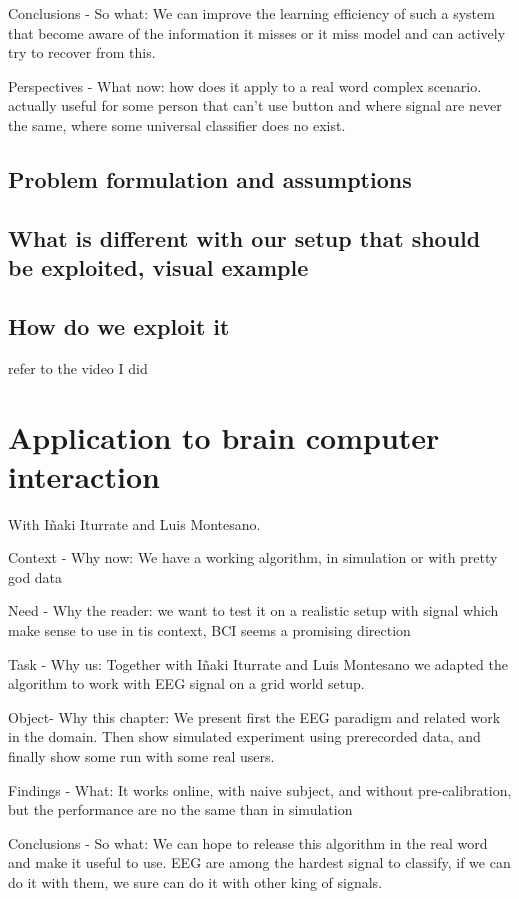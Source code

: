 Conclusions - So what: We can improve the learning efficiency of such a system that become aware of the information it misses or it miss model and can actively try to recover from this.

Perspectives - What now: how does it apply to a real word complex scenario. actually useful for some person that can't use button and where signal are never the same, where some universal classifier does no exist.

\section{Problem formulation and assumptions}

\section{What is different with our setup that should be exploited, visual example}

\section{How do we exploit it}

refer to the video I did

\chapter{Application to brain computer interaction}
\minitoc

With I\~naki Iturrate and Luis Montesano.

Context - Why now: We have a working algorithm, in simulation or with pretty god data

Need - Why the reader: we want to test it on a realistic setup with signal which make sense to use in tis context, BCI seems a promising direction

Task - Why us: Together with I\~naki Iturrate and Luis Montesano we adapted the algorithm to work with EEG signal on a grid world setup.

Object- Why this chapter:  We present first the EEG paradigm and related work in the domain. Then show simulated experiment using prerecorded data, and finally show some run with some real users.

Findings - What: It works online, with naive subject, and without pre-calibration, but the performance are no the same than in simulation

Conclusions - So what: We can hope to release this algorithm in the real word and make it useful to use. EEG are among the hardest signal to classify, if we can do it with them, we sure can do it with other king of signals.

